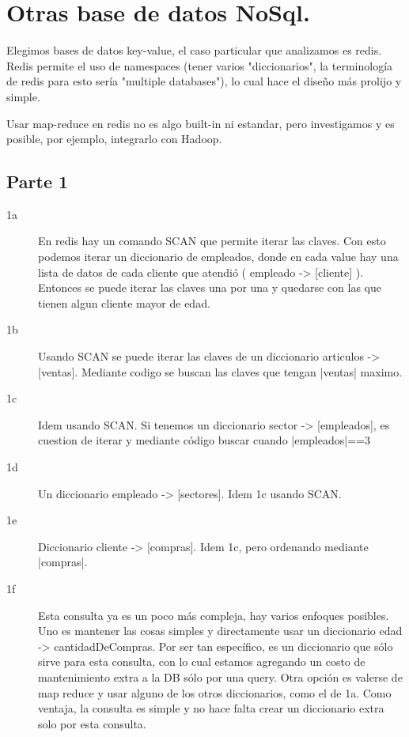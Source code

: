 \section{Otras base de datos NoSql.}


Elegimos bases de datos key-value, el caso particular que analizamos es redis.
Redis permite el uso de namespaces (tener varios "diccionarios", la terminología de redis para esto sería "multiple databases"), lo cual hace el diseño más prolijo y simple.

Usar map-reduce en redis no es algo built-in ni estandar, pero investigamos y es posible, por
    ejemplo, integrarlo con Hadoop.

\subsection{Parte 1}
\begin{description}
\item[1a] En redis hay un comando SCAN que permite iterar las claves.
        Con esto podemos iterar un diccionario de empleados, donde en cada
            value hay una lista de datos de cada cliente que atendió
            ( empleado -> [cliente] ).
        Entonces se puede iterar las claves una por una y quedarse con las que
            tienen algun cliente mayor de edad.
\item[1b]
        Usando SCAN se puede iterar las claves de un diccionario
        articulos -> [ventas]. Mediante codigo se buscan las claves que tengan
        |ventas| maximo.
\item[1c]
        Idem usando SCAN. Si tenemos un diccionario sector -> [empleados], es cuestion
            de iterar y mediante código buscar cuando |empleados|==3

\item[1d]
        Un diccionario empleado -> [sectores]. Idem 1c usando SCAN.

\item[1e]
        Diccionario cliente  -> [compras]. Idem 1c, pero ordenando mediante |compras|.

\item[1f]
        Esta consulta ya es un poco más compleja, hay varios enfoques posibles.
        Uno es mantener las cosas simples y directamente usar un diccionario
            edad -> cantidadDeCompras. Por ser tan específico, es un diccionario
            que sólo sirve para esta consulta, con lo cual estamos agregando
            un costo de mantenimiento extra a la DB sólo por una query.
        Otra opción es valerse de map reduce y usar alguno de los otros diccionarios,
            como el de 1a. Como ventaja, la consulta es simple y no hace falta crear un diccionario extra
            solo por esta consulta.
\end{description}


